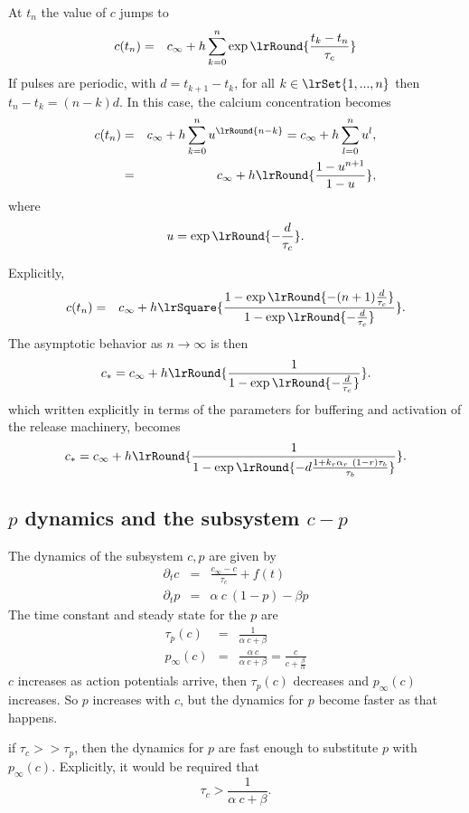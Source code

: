 At $t_{n}$ the value of $c$ jumps to
 \begin{eqnarray*} 
c(t_{n}) &=&  c_{\infty} +h \sum_{k=0}^{n} \exp\lrRound{ \frac{t_{k}-t_{n}}{\tau_{c}}}
 \end{eqnarray*}
 If pulses are periodic, with $d= t_{k+1}-t_{k}$, for all $k \in \lrSet{1,...,n}$ then $t_{n}-t_{k} =(n-k) d$.  
 In this case, the calcium concentration becomes
 \begin{eqnarray*} 
c(t_{n}) &=&  c_{\infty} +h  \sum_{k=0}^{n} u^{\lrRound{ n-k}} =  c_{\infty} +h  \sum_{l=0}^{n} u^{l},
\\
&=&  c_{\infty} +h \lrRound{ \frac{1-u^{n+1}}{1-u} },
\end{eqnarray*}
where
 \begin{equation}
 u= \exp\lrRound{- \frac{d}{\tau_{c}}}.
 \end{equation}

 
Explicitly,
 \begin{eqnarray} 
c(t_{n}) &=&    c_{\infty} +h \lrSquare{ \frac{1-\exp\lrRound{- (n+1)\frac{d}{\tau_{c}}}}{1-\exp\lrRound{- \frac{d}{\tau_{c}}}} }.
\end{eqnarray}
The asymptotic behavior as $n\rightarrow \infty$ is then 
\begin{equation} 
c_{*}  =  c_{\infty} +h \lrRound{ \frac{1}{1-\exp\lrRound{- \frac{d}{\tau_{c}}}} }.
\end{equation}
which written explicitly in terms of the parameters for {\calcium} buffering and activation of the release machinery, becomes
\begin{equation} 
c_{*}  =  c_{\infty} +h \lrRound{ \frac{1}{1-\exp\lrRound{- d\frac{1+ k_{r} \alpha_{r}~(1-r) \tau_{b} }{\tau_{b}}}} }.
\end{equation}

\subsection{$p$ dynamics and the subsystem $c-p$}
The dynamics of the subsystem $c,p$ are given by 
\begin	{eqnarray}
\partial_{t} c &=& \frac{c_{\infty}-c}{\tau_{c}} + f(t)
\\
\partial_{t} p &=&  \alpha ~c~(1-p) - \beta p  
\end{eqnarray}
The time constant and steady state for the $p$ are 
\begin	{eqnarray}
\tau_{p}(c) &=& \frac{1}{\alpha ~c + \beta} 
\\
p_{\infty}(c) &=&  \frac{\alpha ~c}{\alpha ~c + \beta} = \frac{c}{c + \frac{\beta}{\alpha}}
\end{eqnarray}
$c$ increases as action potentials arrive, then $\tau_{p}(c)$  decreases and $p_{\infty}(c)$ increases. So $p$ increases with $c$, but the dynamics for $p$ become faster as that happens. 

if $\tau_{c}>>\tau_{p}$, then 
the dynamics for $p$ are fast enough to substitute $p$ with $p_{\infty}(c)$. Explicitly, it would be required that 
\begin	{equation*}\tau_{c}>\frac{1}{\alpha ~c + \beta}.
\end{equation*}





